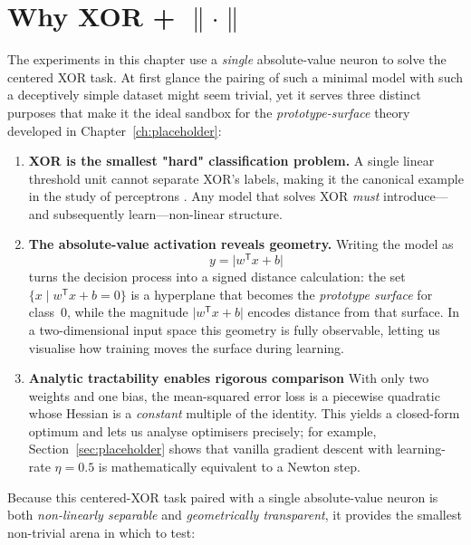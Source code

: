 ﻿%
\section{Why XOR + $\|\cdot\|$}
\label{sec:abs1-motivation}

The experiments in this chapter use a \emph{single} absolute-value neuron to solve the centered XOR task.  At first glance the pairing of such a minimal model with such a deceptively simple dataset might seem trivial, yet it serves three distinct purposes that make it the ideal sandbox for the \textit{prototype-surface} theory developed in Chapter~\ref{ch:placeholder}:

\begin{enumerate}[leftmargin=*]

\item \textbf{XOR is the smallest "hard" classification problem.}
A single linear threshold unit cannot separate XOR's labels, making it the canonical example in the study of perceptrons
\cite{minsky1969perceptrons}.  Any model that solves XOR \emph{must} introduce—and subsequently learn—non-linear structure.

\item \textbf{The absolute-value activation reveals geometry.}
Writing the model as
\[
y = \lvert w^{\mathsf T}x + b \rvert
\]
turns the decision process into a signed distance calculation: the set $\{x \mid w^{\mathsf T}x + b = 0\}$ is a hyperplane that becomes the \emph{prototype surface} for class~$0$, while the magnitude $\lvert w^{\mathsf T}x + b\rvert$ encodes distance from that surface. In a two-dimensional input space this geometry is fully observable, letting us visualise how training moves the surface during learning.

\item \textbf{Analytic tractability enables rigorous comparison}
With only two weights and one bias, the mean-squared error loss is a piecewise quadratic whose Hessian is a \emph{constant} multiple of the identity.  This yields a closed-form optimum and lets us analyse
optimisers precisely; for example, Section~\ref{sec:placeholder} shows that vanilla gradient descent with learning-rate
$\eta = 0.5$ is mathematically equivalent to a Newton step.

\end{enumerate}

Because this centered-XOR task paired with a single absolute-value neuron is both \emph{non-linearly separable} and \emph{geometrically transparent}, it provides the smallest non-trivial arena in which to test:

